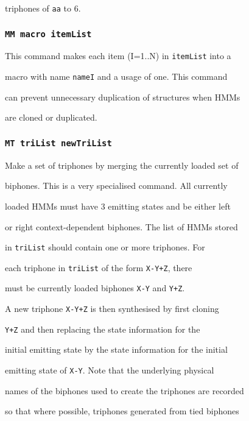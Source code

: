 triphones of \texttt{aa} to 6.





\subsubsection*{\tt MM macro itemList}





This command makes each item (I=1..N) in \texttt{itemList} into a 


macro with name \texttt{nameI} and a usage of one.  This command


can prevent unnecessary duplication of structures when HMMs


are cloned or duplicated.





\subsubsection*{\tt MT triList newTriList}





Make  a set of triphones by merging the currently loaded set of


biphones.  This is a very specialised command.  All currently


loaded HMMs must have 3 emitting states and be either left


or right context-dependent biphones.  The list of HMMs stored


in \texttt{triList} should contain one or more triphones.  For


each triphone in \texttt{triList} of the form \texttt{X-Y+Z}, there


must be currently loaded biphones \texttt{X-Y} and \texttt{Y+Z}.


A new triphone \texttt{X-Y+Z} is then synthesised by first cloning


\texttt{Y+Z} and then replacing the state information for the


initial emitting state by the state information for the initial


emitting state of \texttt{X-Y}.  Note that the underlying physical


names of the biphones used to create the triphones are recorded


so that where possible, triphones generated from tied biphones


